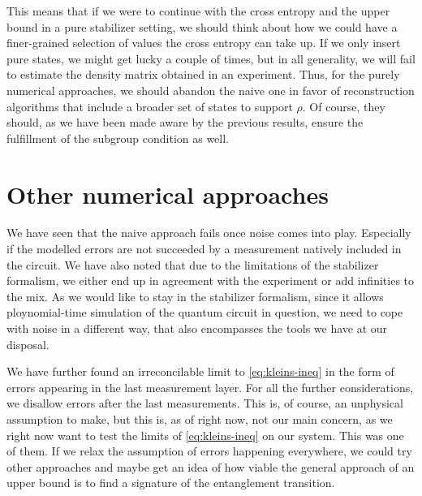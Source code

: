 This means that if we were to continue with the cross entropy and the upper
bound in a pure stabilizer setting, we should think about how we could have a
finer-grained selection of values the cross entropy can take up. If we only
insert pure states, we might get lucky a couple of times, but in all
generality, we will fail to estimate the density matrix obtained in an
experiment. Thus, for the purely numerical approaches, we should abandon the
naive one in favor of reconstruction algorithms that include a broader set of
states to support $\rho$. Of course, they should, as we have been made aware by
the previous results, ensure the fulfillment of the subgroup condition as well. 

\section{Other numerical approaches}\label{sec:upperbound-numerics}

We have seen that the naive approach fails once noise comes into play.
Especially if the modelled errors are not succeeded by a measurement natively
included in the circuit. We have also noted that due to the limitations of the
stabilizer formalism, we either end up in agreement with the experiment or add
infinities to the mix. 
As we would like to stay in the stabilizer formalism, since it allows
ploynomial-time simulation of the quantum circuit in question, we need to cope
with noise in a different way, that also encompasses the tools we have at our
disposal. 

We have further found an irreconcilable limit to \cref{eq:kleins-ineq} in the
form of errors appearing in the last measurement layer. For all the further
considerations, we disallow errors after the last measurements. This is, of
course, an unphysical assumption to make, but this is, as of right now, not our
main concern, as we right now want to test the limits of \cref{eq:kleins-ineq}
on our system. This was one of them. If we relax the assumption of errors
happening everywhere, we could try other approaches and maybe get an idea of
how viable the general approach of an upper bound is to find a signature of the
entanglement transition.

